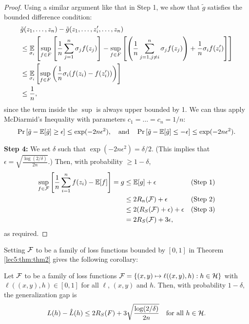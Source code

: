 \begin{proof}
Using a similar argument like that in Step 1, we show that $\tilde g$ satisfies the bounded difference condition:
\begin{align}
    &\tilde g(z_1, \dots, z_n) - \tilde g(z_1, \dots, z_i', \dots, z_n) \nonumber \\
    &\leq \operatorname*{\mathbb{E}}_{\sigma_i} \left[\sup_{f\in F} \left[ \frac{1}{n} \sum^{n}_{j=1} \sigma_j f(z_j) \right] - \sup_{f\in F} \left[ \left(\frac{1}{n} \sum^{n}_{j=1, j \neq i} \sigma_j f(z_j)\right) + \frac{1}{n} \sigma_if(z_i')\right]\right]\\
    &\leq \operatorname*{\mathbb{E}}_{\sigma_i}\left[\sup_{f\in F} \left(\frac{1}{n} \sigma_i(f(z_i) - f(z_i'))\right)\right] \\
    &\leq \frac{1}{n},
\end{align}
since the term inside the $\sup$ is always upper bounded by 1. We can thus apply McDiarmid's Inequality with parameters $c_1 = \dots = c_n = 1/n$:
\begin{align}
    \Pr\left[ \tilde g - \operatorname*{\mathbb{E}}[\tilde g] \geq \epsilon \right] \leq \exp(-2n \epsilon^2), \quad\text{and}\quad
    \Pr\left[ \tilde g - \operatorname*{\mathbb{E}}[\tilde g] \leq -\epsilon \right] \leq \exp(-2n \epsilon^2).
\end{align}

\textbf{Step 4:} We set $\delta$ such that $\exp(-2n \epsilon^2) = \delta/2$. (This implies that $\epsilon = \sqrt{\frac{\log(2/\delta)}{2n}}$.) Then, with probability $\geq 1 - \delta$,
\begin{align}
    \sup_{f\in \mathcal F} \left[ \frac{1}{n} \sum^n_{i=1} f(z_i) - \operatorname*{\mathbb{E}}[f]\right] = g &\leq \operatorname*{\mathbb{E}}[g] + \epsilon &\text{(Step 1)} \\
    &\leq 2R_n(\mathcal F) + \epsilon &\text{(Step 2)} \\
    &\leq 2(R_S(\mathcal F) + \epsilon) + \epsilon &\text{(Step 3)} \\
    &= 2R_S(\mathcal F) + 3\epsilon,
\end{align}
as required.
\end{proof}

Setting $\mathcal F$ to be a family of loss functions bounded by $[0,1]$ in Theorem \ref{lec5:thm:thm2} gives the following corollary:
\begin{corollary}\label{lec6:cor:ggap-rsbound}
Let $\mathcal F$ to be a family of loss functions $\mathcal F = \left\{ (x,y) \mapsto \ell((x,y),h): h \in \mathcal H \right\}$ with $\ell((x,y), h) \in [0,1]$ for all $\ell$, $(x,y)$ and $h$. Then, with probability $1-\delta,$ the generalization gap is
    \begin{equation}\label{lec6:eqn:ggap-rsbound}
        L(h) - \hat L(h) \leq 2R_S(F) + 3\sqrt{\frac{\log(2/\delta)}{2n}} \quad \text{for all } h\in \mathcal H.
    \end{equation}
\end{corollary}

